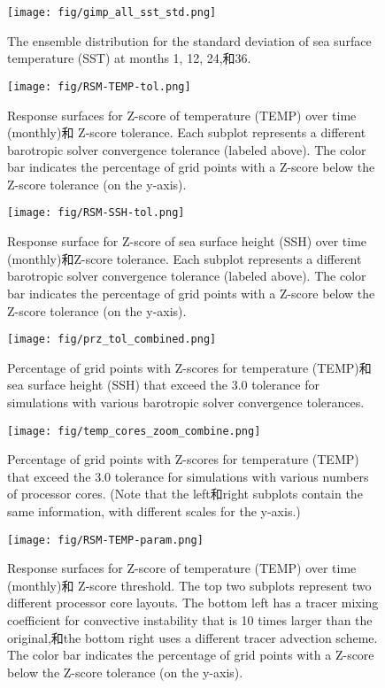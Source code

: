 \clearpage
\begin {figure}[h]
\centering
\texttt{[image: fig/gimp\_all\_sst\_std.png]}
\caption{The ensemble distribution for the standard deviation of sea surface temperature (SST) at months 1, 12, 24,和36.}
\label{fig:SST_STD_all}
\end {figure}

\clearpage
\begin {figure}[h]
\centering
\texttt{[image: fig/RSM-TEMP-tol.png]}
\caption {Response surfaces for Z-score of temperature (TEMP) over time (monthly)和 Z-score tolerance.  Each subplot represents a different barotropic
solver convergence tolerance (labeled above). The color bar indicates the percentage of grid points with a Z-score below the Z-score tolerance (on the y-axis).}
\label{fig:RSM-TEMP-tol}
\end {figure}

\clearpage
\begin {figure}[h]
\centering
\texttt{[image: fig/RSM-SSH-tol.png]}
\caption {Response surface for Z-score of sea surface height (SSH) over time (monthly)和Z-score tolerance.  Each subplot represents a different barotropic
solver convergence tolerance (labeled above). The color bar indicates the percentage of grid points with a Z-score below the Z-score tolerance (on the y-axis).}
\label{fig:RSM-SSH-tol}
\end {figure}


\clearpage
\begin{figure}[h]
\centering 
\texttt{[image: fig/prz\_tol\_combined.png]}
\caption {Percentage of grid points with Z-scores for temperature
  (TEMP)和sea surface height (SSH) that exceed the 3.0 tolerance for simulations with various barotropic solver convergence tolerances. }
\label {fig:PRZ-tol}
\end{figure}

\clearpage
\begin{figure}[h]
\texttt{[image: fig/temp\_cores\_zoom\_combine.png]}
\caption{Percentage of grid points with Z-scores for temperature (TEMP) that exceed the 3.0 tolerance for simulations with various numbers of processor cores. (Note that the left和right subplots contain the same information, with different scales for the y-axis.)}
\label {fig:combine}
\end{figure}

\clearpage
\begin {figure}[h]
\centering
\texttt{[image: fig/RSM-TEMP-param.png]}
\caption {Response surfaces for Z-score of temperature (TEMP) over time (monthly)和 Z-score threshold.  The top two subplots represent two different processor core layouts.
The bottom left has a tracer mixing coefficient for convective instability that is 10 times larger than the original,和the bottom right uses a different tracer advection scheme. The color bar indicates the percentage of grid points with a Z-score below the Z-score tolerance (on the y-axis).}
\label{fig:RSM-TEMP-param}
\end {figure}

